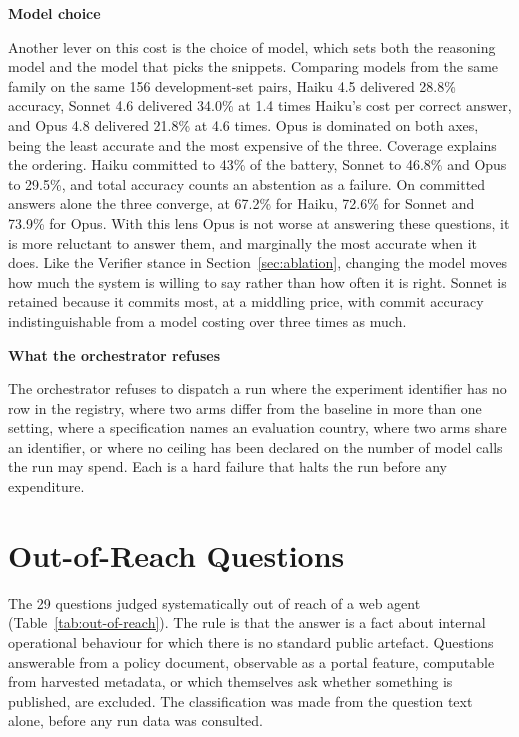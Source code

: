 \textbf{Model choice}

Another lever on this cost is the choice of model, which sets both the reasoning model and the model that picks the snippets. Comparing models from the same family on the same 156 development-set pairs, Haiku 4.5 delivered 28.8\% accuracy, Sonnet 4.6 delivered 34.0\% at 1.4 times Haiku's cost per correct answer, and Opus 4.8 delivered 21.8\% at 4.6 times. Opus is dominated on both axes, being the least accurate and the most expensive of the three. Coverage explains the ordering. Haiku committed to 43\% of the battery, Sonnet to 46.8\% and Opus to 29.5\%, and total accuracy counts an abstention as a failure. On committed answers alone the three converge, at 67.2\% for Haiku, 72.6\% for Sonnet and 73.9\% for Opus. With this lens Opus is not worse at answering these questions, it is more reluctant to answer them, and marginally the most accurate when it does. Like the Verifier stance in Section~\ref{sec:ablation}, changing the model moves how much the system is willing to say rather than how often it is right. Sonnet is retained because it commits most, at a middling price, with commit accuracy indistinguishable from a model costing over three times as much.

\textbf{What the orchestrator refuses}

The orchestrator refuses to dispatch a run where the experiment identifier has no row in the registry, where two arms differ from the baseline in more than one setting, where a specification names an evaluation country, where two arms share an identifier, or where no ceiling has been declared on the number of model calls the run may spend. Each is a hard failure that halts the run before any expenditure.

\chapter{Out-of-Reach Questions}\label{app:out-of-reach}

The 29 questions judged systematically out of reach of a web agent (Table~\ref{tab:out-of-reach}). The rule is that the answer is a fact about internal operational behaviour for which there is no standard public artefact. Questions answerable from a policy document, observable as a portal feature, computable from harvested metadata, or which themselves ask whether something is published, are excluded. The classification was made from the question text alone, before any run data was consulted.

